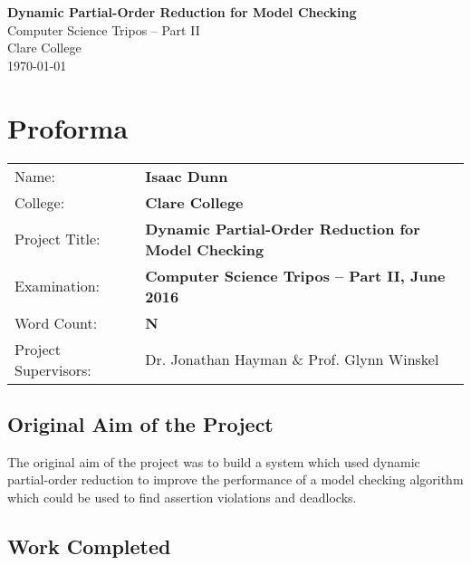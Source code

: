 \documentclass[12pt,a4paper,twoside,openright]{report}
\begin{document}





\pagestyle{empty}


\vspace*{60mm}
\begin{center}
\Huge
\textbf{Dynamic Partial-Order Reduction for Model Checking} \\[5mm]
Computer Science Tripos -- Part II \\[5mm]
Clare College \\[5mm]
\today  %
\end{center}


\pagestyle{plain}

\chapter*{Proforma}

{\large
\begin{tabular}{ll}
Name:               & \bf Isaac Dunn                            			 \\
College:            & \bf Clare College                    				     \\
Project Title:      & \bf Dynamic Partial-Order Reduction for Model Checking \\
Examination:        & \bf Computer Science Tripos -- Part II, June 2016      \\
Word Count:         & \bf N    \\
Project Supervisors:& Dr. Jonathan Hayman \& Prof. Glynn Winskel             \\ 
\end{tabular}
}


\section*{Original Aim of the Project}

The original aim of the project was to build a system which
used dynamic partial-order reduction to improve the performance
of a model checking algorithm which could be used to find
assertion violations and deadlocks.

\section*{Work Completed}
\end{document}
